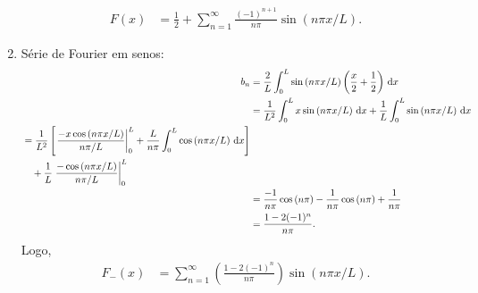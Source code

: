 \begin{exem}
\begin{enumerate}
\begin{align*}
                F(x) &= \frac{1}{2} + \sum_{n = 1}^\infty \frac{(-1)^{n + 1}}{n \pi} \sin\left( n \pi x / L \right).
            \end{align*}
            \begin{center}
            \end{center}

        \item S\'{e}rie de Fourier em senos:
            \begin{align*}
                b_n &= \frac{2}{L} \int_0^L \sin\left( n \pi x / L \right) \left( \frac{x}{2} + \frac{1}{2} \right) \, \mathrm{d}x \\
                &= \frac{1}{L^2} \int_0^L x \sin\left( n \pi x / L \right) \, \mathrm{d}x + \frac{1}{L} \int_0^L \sin\left( n \pi x / L \right) \, \mathrm{d}x \\
                \begin{split}
                    &= \frac{1}{L^2} \left[ \left. \frac{- x \cos\left( n \pi x / L \right)}{n \pi / L} \right|_0^L + \frac{L}{n \pi} \int_0^L \cos\left( n \pi x / L \right) \, \mathrm{d}x \right] \\
                    &\quad {}+ \frac{1}{L} \left. \frac{- \cos\left( n \pi x / L \right)}{n \pi / L} \right|_0^L
                \end{split} \\
                &= \frac{-1}{n \pi} \cos\left( n \pi \right) - \frac{1}{n \pi} \cos\left( n \pi \right) + \frac{1}{n \pi} \\
                &= \frac{1 - 2 (-1)^n}{n \pi}.
            \end{align*}
            Logo,
            \begin{align*}
                F_-(x) &= \sum_{n = 1}^\infty \left( \frac{1 - 2 (-1)^n}{n \pi} \right) \sin\left( n \pi x / L \right).
            \end{align*}


\end{enumerate}
\end{exem}
